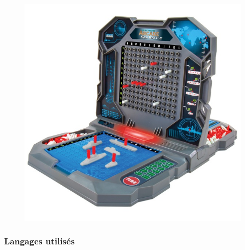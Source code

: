 \documentclass{beamer}
\begin{document}
\begin{frame}
\begin{minipage}[t]{0.48\linewidth}
\begin{figure}[H]
      \includegraphics[width=\linewidth]{images/diapo/imageBatailleNavale.jpg}
    \end{figure}
  \end{minipage}
\end{frame}

\begin{frame}
  \frametitle{Langages utilisés}
    
  

\end{frame}
\end{document}

